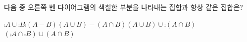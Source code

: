 \noindent\begin{minipage}[t]{0.58\linewidth}\vspace{0pt}\raggedright 다음 중 오른쪽 벤 다이어그램의 색칠한 부분을 나타내는 집합과 항상 같은 집합은?\end{minipage}\hfill\begin{minipage}[t]{0.4\linewidth}\vspace{0pt}\centering \resizebox{\ifdim\width>\linewidth\linewidth\else\width\fi}{!}{}\end{minipage}\par
\begin{choicesv}{$\comp{A}\cup\comp{B}$}{$\comp{(A-B)}$}{$(A\cup B)-(A\cap B)$}{$(A\cup B)\cup\comp{(A\cap B)}$}{$(\comp{A}\cap\comp{B})\cup(A\cap B)$}\end{choicesv}
